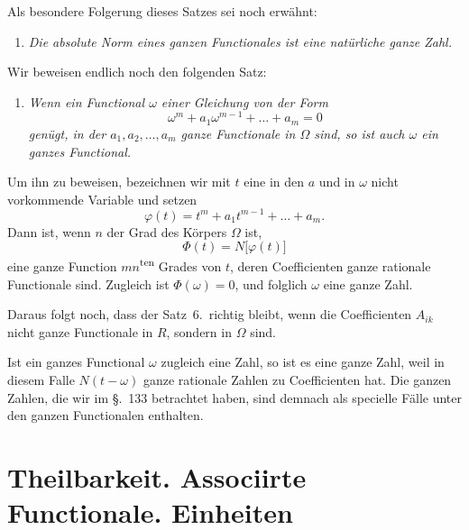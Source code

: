 \documentclass[12pt,a4paper]{article}
\theoremstyle{definition}
\begin{document}
Als besondere Folgerung dieses Satzes sei noch erwähnt:

\begin{enumerate}[label=\arabic*., resume]
\item \textit{Die absolute Norm eines ganzen Functionales ist eine natürliche ganze Zahl.}
\end{enumerate}

Wir beweisen endlich noch den folgenden Satz:

\begin{enumerate}[label=\arabic*., resume]
\item \textit{Wenn ein Functional $\omega$ einer Gleichung von der Form}
\begin{equation}\label{eq:137-10}
\omega^m + a_1\omega^{m-1} + \dots + a_m = 0
\end{equation}
\textit{genügt, in der $a_1,a_2,\dots,a_m$ ganze Functionale in $\Omega$ sind, so ist auch $\omega$ ein ganzes Functional.}
\end{enumerate}

Um ihn zu beweisen, bezeichnen wir mit $t$ eine in den $a$ und in $\omega$ nicht vorkommende Variable und setzen
\begin{equation}\label{eq:137-11}
\varphi(t) = t^m + a_1t^{m-1} + \dots + a_m.
\end{equation}
Dann ist, wenn $n$ der Grad des Körpers $\Omega$ ist,
\[
\Phi(t) = N\bigl[\varphi(t)\bigr]
\]
eine ganze Function $mn$\textsuperscript{ten} Grades von $t$, deren Coefficienten ganze rationale Functionale sind. Zugleich ist $\Phi(\omega)=0$, und folglich $\omega$ eine ganze Zahl.

Daraus folgt noch, dass der Satz~6.\ richtig bleibt, wenn die Coefficienten $A_{ik}$ nicht ganze Functionale in $R$, sondern in $\Omega$ sind.

Ist ein ganzes Functional $\omega$ zugleich eine Zahl, so ist es eine ganze Zahl, weil in diesem Falle $N(t-\omega)$ ganze rationale Zahlen zu Coefficienten hat. Die ganzen Zahlen, die wir im \S.~133 betrachtet haben, sind demnach als specielle Fälle unter den ganzen Functionalen enthalten.

\newpage
\section[Theilbarkeit. Associirte Functionale. Einheiten]%
        {Theilbarkeit. Associirte Functionale. Einheiten}\label{sec:138}
\end{document}
